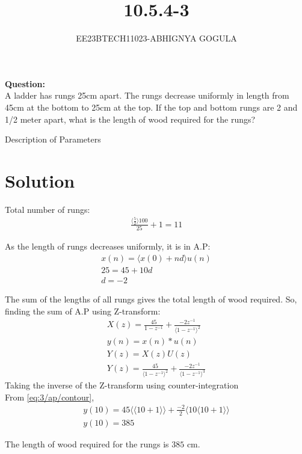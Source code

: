 \documentclass[journal,12pt,twocolumn]{IEEEtran}
\newcommand{\brak}[1]{\langle #1 \rangle}
\theoremstyle{remark}
\begin{document}

\vspace{3cm}
\title{\textbf{10.5.4-3}}
\author{EE23BTECH11023-ABHIGNYA GOGULA}
\maketitle
\newpage
\bigskip
\renewcommand{\thefigure}{\theenumi}
\renewcommand{\thetable}{\theenumi}
\textbf{Question:}
\\
 A ladder has rungs 25cm apart. The rungs decrease uniformly in length from 45cm at the bottom to 25cm at the top. If the top and bottom rungs are 2 and 1/2 meter apart, what is the length of wood required for the rungs?

\begin{table}[h]
\centering

\caption{Description of Parameters}
\label{tab:parameter-values}
\end{table}

\section*{Solution}
Total number of rungs:
\begin{align}
\frac{\brak{\frac{5}{2}}100}{25}+1 = 11
\end{align}

As the length of rungs decreases uniformly, it is in A.P:
\begin{align}
x(n) = \brak{x(0) + nd}u(n) \\
25 = 45 + 10d \\
d = -2
\end{align}

The sum of the lengths of all rungs gives the total length of wood required. So, finding the sum of A.P using Z-transform:
\begin{align}
X(z) = \frac{45}{1-z^{-1}} + \frac{-2z^{-1}}{\brak{1-z^{-1}}^{2}}\\
y(n)=x(n)*u(n)\\
Y(z)=X(z)U(z)\\
Y(z)=\frac{45}{\brak{1-z^{-1}}^2}+ \frac{-2z^{-1}}{\brak{1-z^{-1}}^{3}}
\end{align}
Taking the inverse of the Z-transform using counter-integration\\
From \eqref{eq:3/ap/contour},
\begin{align}
y(10) = 45\brak{\brak{10+1}}+\frac{-2}{2}\brak{10\brak{10+1}} \\
y(10) = 385
\end{align}

The length of wood required for the rungs is $385$ cm.
\end{document}
